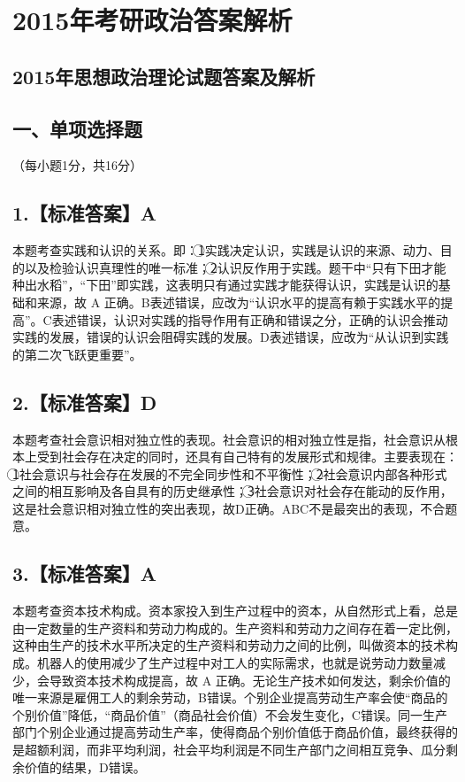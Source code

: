 \documentclass[UTF8,11pt]{ctexart}
\begin{document}
\section*{2015年考研政治答案解析}
\subsection*{2015年思想政治理论试题答案及解析}

\subsection*{一、单项选择题}

（每小题1分，共16分）


\subsection*{1.【标准答案】A}

本题考查实践和认识的关系。即：\textcircled{1}实践决定认识，实践是认识的来源、动力、目的以及检验认识真理性的唯一标准；\textcircled{2}认识反作用于实践。题干中“只有下田才能种出水稻”，“下田”即实践，这表明只有通过实践才能获得认识，实践是认识的基础和来源，故 A 正确。B表述错误，应改为“认识水平的提高有赖于实践水平的提高”。C表述错误，认识对实践的指导作用有正确和错误之分，正确的认识会推动实践的发展，错误的认识会阻碍实践的发展。D表述错误，应改为“从认识到实践的第二次飞跃更重要”。


\subsection*{2.【标准答案】D}

本题考查社会意识相对独立性的表现。社会意识的相对独立性是指，社会意识从根本上受到社会存在决定的同时，还具有自己特有的发展形式和规律。主要表现在：\textcircled{1}社会意识与社会存在发展的不完全同步性和不平衡性；\textcircled{2}社会意识内部各种形式之间的相互影响及各自具有的历史继承性；\textcircled{3}社会意识对社会存在能动的反作用，这是社会意识相对独立性的突出表现，故D正确。ABC不是最突出的表现，不合题意。


\subsection*{3.【标准答案】A}

本题考查资本技术构成。资本家投入到生产过程中的资本，从自然形式上看，总是由一定数量的生产资料和劳动力构成的。生产资料和劳动力之间存在着一定比例，这种由生产的技术水平所决定的生产资料和劳动力之间的比例，叫做资本的技术构成。机器人的使用减少了生产过程中对工人的实际需求，也就是说劳动力数量减少，会导致资本技术构成提高，故 A 正确。无论生产技术如何发达，剩余价值的唯一来源是雇佣工人的剩余劳动，B错误。个别企业提高劳动生产率会使“商品的个别价值”降低，“商品价值”（商品社会价值）不会发生变化，C错误。同一生产部门个别企业通过提高劳动生产率，使得商品个别价值低于商品价值，最终获得的是超额利润，而非平均利润，社会平均利润是不同生产部门之间相互竞争、瓜分剩余价值的结果，D错误。
\end{document}
